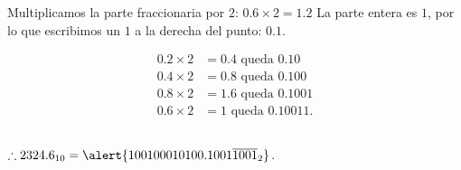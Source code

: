 \begin{frame}
\begin{solution}
\begin{columns}[t]
\begin{column}{0.48\textwidth}
\begin{description}
						Multiplicamos la parte fraccionaria por $2$:
						$0.6\times2=1.2$
						La parte entera es $1$, por lo que escribimos un $1$ a la
						derecha del punto: $0.1$.

						\begin{align*}
							0.2 \times 2 & = 0.4  \text{ queda } 0.10     \\
							0.4 \times 2 & = 0.8  \text{ queda } 0.100    \\
							0.8 \times 2 & = 1.6  \text{ queda } 0.1001   \\
							0.6 \times 2 & = 1    \text{ queda } 0.10011.
						\end{align*}
				\end{description}
			\end{column}
		\end{columns}
		\begin{math}
			\therefore
			2324.6_{10}=
			\alert{100100010100.1001\overline{1001}_{2}}
		\end{math}.
	\end{solution}
\end{frame}